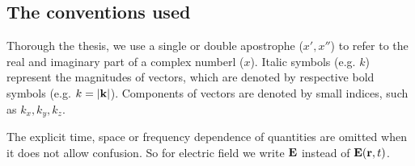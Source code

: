 
\subsection{The conventions used}%
Thorough the thesis, we use a single or double apostrophe ($x', x''$) to refer to the real and imaginary part of a complex numberl ($x$). Italic symbols (e.g. $k$) represent the magnitudes of vectors, which are denoted by respective bold symbols (e.g. $k = |{\mathbf{k}}|$). Components of vectors are denoted by small indices, such as $k_x, k_y, k_z$.

The explicit time, space or frequency dependence of quantities are omitted when it does not allow confusion. So for electric field we write $\mathbf{E}$ instead of $\mathbf{E}({\mathbf{r}},t)$.

